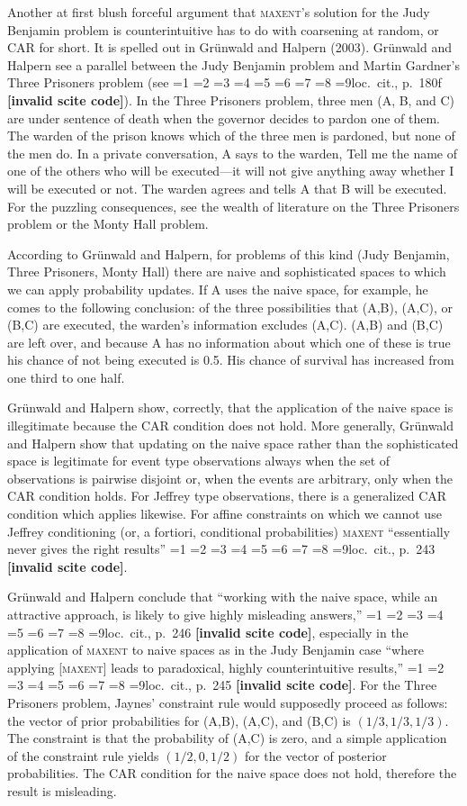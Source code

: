 \documentclass[12pt]{article}
\newcommand{\nonsc}[1]{}
\newcommand{\qeins}[1]{``#1''}
\newif\ifNumericalOrYear
\newcommand{\PageP}{p.~}
\newcommand{\PageP}{}
\newcommand{\nias}{\noindent} %
\newcommand{\scite}[3]{\ifnum#1=1\ifNumericalOrYear\citep{#2}\else\citeyearpar{#2}\fi\else
\ifnum#1=2\ifNumericalOrYear\citep[#3]{#2}\else\citep[{\PageP}#3]{#2}\fi\else
\ifnum#1=3\ifNumericalOrYear(\citet[#3]{#2})\else\citep[{\PageP}#3]{#2}\fi\else
\ifnum#1=4\ifNumericalOrYear\citet{#2}\else\citet{#2}\fi\else
\ifnum#1=5\ifNumericalOrYear(\citet{#2})\else\citep{#2}\fi\else
\ifnum#1=6\ifNumericalOrYear(\citet[#3]{#2})\else\citep[{\PageP}#3]{#2}\fi\else
\ifnum#1=7\ifNumericalOrYear\citep{#2}\else\citealp{#2}\fi\else
\ifnum#1=8\ifNumericalOrYear\citep[#3]{#2}\else\citealp[{\PageP}#3]{#2}\fi\else
\ifnum#1=9\ifNumericalOrYear\citep[#3]{#2}\else{}loc.\ cit., {\PageP}#3\fi\else
\textbf{[invalid scite code]}\fi\fi\fi\fi\fi\fi\fi\fi\fi}
\begin{document}
\bigskip

\nias Another at first blush forceful argument that \textsc{maxent}'s
solution for the Judy Benjamin problem is counterintuitive has to do
with coarsening at random, or CAR for short. It is spelled out in
Gr{\"u}nwald and Halpern (2003)\nonsc{}. Gr{\"u}nwald and Halpern see
a parallel between the Judy Benjamin problem and Martin Gardner's
Three Prisoners problem (see \scite{8}{gardner59}{180f}). In the Three
Prisoners problem, three men (A, B, and C) are under sentence of death
when the governor decides to pardon one of them. The warden of the
prison knows which of the three men is pardoned, but none of the men
do. In a private conversation, A says to the warden, Tell me the name
of one of the others who will be executed---it will not give anything
away whether I will be executed or not. The warden agrees and tells A
that B will be executed. For the puzzling consequences, see the wealth
of literature on the Three Prisoners problem or the Monty Hall
problem.

According to Gr{\"u}nwald and Halpern, for problems of this kind (Judy
Benjamin, Three Prisoners, Monty Hall) there are naive and
sophisticated spaces to which we can apply probability updates. If A
uses the naive space, for example, he comes to the following
conclusion: of the three possibilities that (A,B), (A,C), or (B,C) are
executed, the warden's information excludes (A,C). (A,B) and (B,C) are
left over, and because A has no information about which one of these
is true his chance of not being executed is 0.5. His chance of
survival has increased from one third to one half. 

Gr{\"u}nwald and Halpern show, correctly, that the application of the
naive space is illegitimate because the CAR condition does not hold.
More generally, Gr{\"u}nwald and Halpern show that updating on the
naive space rather than the sophisticated space is legitimate for
event type observations always when the set of observations is
pairwise disjoint or, when the events are arbitrary, only when the CAR
condition holds. For Jeffrey type observations, there is a generalized
CAR condition which applies likewise. For affine constraints on which
we cannot use Jeffrey conditioning (or, a fortiori, conditional
probabilities) \textsc{maxent }\qeins{essentially never gives the
  right results} \scite{2}{gruenwaldhalpern03}{243}.

Gr{\"u}nwald and Halpern conclude that \qeins{working with the naive
  space, while an attractive approach, is likely to give highly
  misleading answers,} \scite{9}{gruenwaldhalpern03}{246}, especially
in the application of \textsc{maxent} to naive spaces as in the Judy
Benjamin case \qeins{where applying [\textsc{maxent}] leads to
  paradoxical, highly counterintuitive results,}
\scite{9}{gruenwaldhalpern03}{245}. For the Three Prisoners problem,
Jaynes' constraint rule would supposedly proceed as follows: the
vector of prior probabilities for (A,B), (A,C), and (B,C) is
$(1/3,1/3,1/3)$. The constraint is that the probability of (A,C) is
zero, and a simple application of the constraint rule yields
$(1/2,0,1/2)$ for the vector of posterior probabilities. The CAR
condition for the naive space does not hold, therefore the result is
misleading. 
\end{document}
